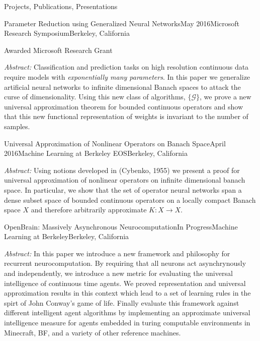 \documentclass{resume} %
\begin{document}
\begin{rSection}{Projects, Publications, Presentations}

\begin{rSubsection}{Parameter Reduction using Generalized Neural Networks}{May 2016}{Microsoft Research Symposium}{Berkeley, California}	
\item {Awarded Microsoft Research Grant}
\item \emph{Abstract: }Classification and prediction tasks
on high resolution continuous data require models with \emph{exponentially many parameters}.
In this paper we generalize artificial neural networks to infinite dimensional Banach spaces to attack the curse of dimensionality. Using this new class of algorithms, $\{\mathcal{G}\}$, 
we prove a new universal approximation theorem for bounded continuous operators and show that this new functional representation
of weights is invariant to the number of samples.
\end{rSubsection}

\begin{rSubsection}{Universal Approximation of Nonlinear Operators on Banach Space}{April 2016}{Machine Learning at Berkeley EOS}{Berkeley, California}
\item \emph{Abstract: }Using notions developed in (Cybenko, 1955) we present a proof for universal approximation of nonlinear operators on infinite dimensional banach space. In particular, we show that the set of operator neural networks span a dense subset space of bounded continuous operators on a locally compact Banach space $X$ and therefore arbitrarily approximate $K: X \to X $.
\end{rSubsection}

\begin{rSubsection}{
OpenBrain: Massively Asynchronous Neurocomputation}{In Progress}{Machine Learning at Berkeley}{Berkeley, California}
\item \emph{Abstract: } In this paper we introduce a new framework and philosophy for recurrent neurocomputation. By requiring that all neurons act asynchrynously and independently, we introduce a new metric for evaluating the universal intelligence of continuous time agents. We proved representation and universal approximation results in this context which lead to a set of learning rules in the spirt of John Conway's game of life. Finally evaluate this framework against different intelligent agent algorithms by implementing an approximate universal intelligence measure for agents embedded in turing computable environments in Minecraft, BF, and a variety of other reference machines. 
\end{rSubsection}


\end{rSection}
\end{document}
